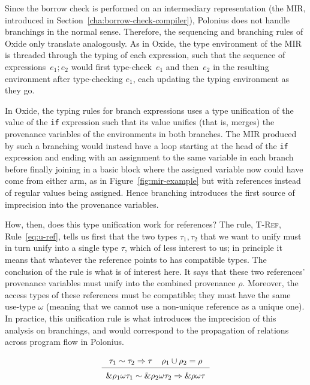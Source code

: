 \documentclass[11pt,a4paper,twoside,openany]{report}
\newcommand{\InRust}[1]{\texttt{#1}}
\newcommand{\expression}[1]{\boxed{#1}}
\newcommand{\ntyperule}[2]{\begin{array}{c}#1\\\midrule\raisebox{1pt}{\strut}#2\end{array}}
\begin{document}
Since the borrow check is performed on an intermediary representation (the MIR,
introduced in Section~\ref{cha:borrow-check-compiler}), Polonius does not handle
branchings in the normal sense. Therefore, the sequencing and branching rules of
Oxide only translate analogously. As in Oxide, the type environment of the MIR
is threaded through the typing of each expression, such that the sequence of
expressions~$\expression{e_1; e_2}$ would first type-check~$e_1$ and then~$e_2$
in the resulting environment after type-checking $e_1$, each updating the typing
environment as they go.

In Oxide, the typing rules for branch expressions uses a type unification of the
value of the \InRust{if} expression such that its value unifies (that is,
merges) the provenance variables of the environments in both branches. The MIR
produced by such a branching would instead have a loop starting at the head of
the \InRust{if} expression and ending with an assignment to the same variable in
each branch before finally joining in a basic block where the assigned variable
now could have come from either arm, as in Figure~\ref{fig:mir-example} but with
references instead of regular values being assigned. Hence branching introduces
the first source of imprecision into the provenance variables.

How, then, does this type unification work for references? The rule,
\textsc{T-Ref}, Rule~\eqref{eq:u-ref}, tells us first that the two types
$\tau_1, \tau_2$ that we want to unify must in turn unify into a single type
$\tau$, which of less interest to us; in principle it means that whatever the
reference points to has compatible types. The conclusion of the rule is what is
of interest here. It says that these two references' provenance variables must
unify into the combined provenance $\rho$. Moreover, the access types of these
references must be compatible; they must have the same use-type $\omega$
(meaning that we cannot use a non-unique reference as a unique one). In
practice, this unification rule is what introduces the imprecision of this
analysis on branchings, and would correspond to the propagation of relations
across program flow in Polonius.

\begin{equation}\label{eq:u-ref}
  \ntyperule{
    \tau_1 \sim \tau_2 \Rightarrow \tau \:\:\:\:\: \rho_1 \cup \rho_2 = \rho}
  {
    \&\rho_1 \omega \tau_1 \sim \& \rho_2  \omega \tau_2 \Rightarrow \&\rho \omega \tau
  }
\end{equation}
\end{document}

